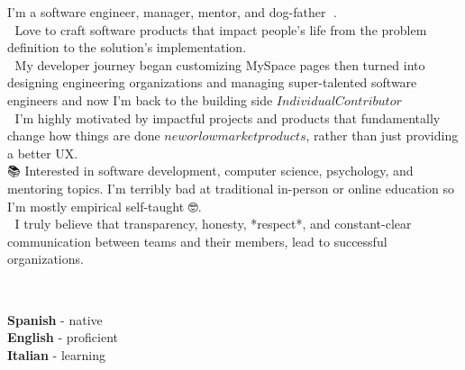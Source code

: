 \documentclass[9pt]{developercv} %
\begin{document}
\vspace{0.5cm}


\begin{minipage}[t]{0.6\textwidth} %

    \vspace{-\baselineskip} %


    {
        I'm a software engineer, manager, mentor, and dog-father 🐶. \\

        💜 Love to craft software products that impact people's life \– from the problem definition to the solution's implementation.  \\

        🚀 My developer journey began customizing MySpace pages then turned into designing engineering organizations and managing super-talented software engineers and now I'm back to the building side \(Individual Contributor\)\ \\

        🧠 I'm highly motivated by impactful projects and products that fundamentally change how things are done \(new or low market products\), rather than just providing a better UX. \\

        📚 Interested in software development, computer science, psychology, and mentoring topics. I'm terribly bad at traditional in-person or online education so I'm mostly empirical self-taught 🤓. \\

        📢 I truly believe that transparency, honesty, *respect*, and constant-clear communication between teams and their members, lead to successful organizations. \\
    }
    
    \lorem \lorem \\ %
\end{minipage}
\hfill
\begin{minipage}[t]{0.3\textwidth}
    \vspace{-\baselineskip} %


    \textbf{Spanish} - native\\
    \textbf{English} - proficient\\
    \textbf{Italian} - learning
\end{minipage}
\end{document}
